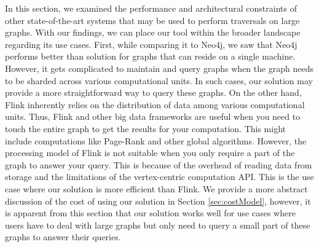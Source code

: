 \bigskip
In this section, we examined the performance and architectural constraints of
other state-of-the-art systems that may be used to perform traversals on
large graphs. With our findings, we can place our tool within the broader
landscape regarding its use cases. First, while comparing it to Neo4j, we saw that
Neo4j performs better than solution for graphs
that can reside on a single machine. However, it gets complicated to maintain
and query graphs when the graph needs to be sharded across various computational
units. In such cases, our solution may provide a more straightforward way to query these
graphs. On the other hand, Flink inherently relies on the distribution of data among
various computational units. Thus, Flink and other big data frameworks are
useful when you need to touch the entire graph to get the results for
your computation. This might include computations like Page-Rank and other
global algorithms. However, the processing model of Flink is not suitable when
you only require a part of the graph to answer your query. This is because of the overhead
of reading data from storage and the limitations of the vertex-centric computation API. This is 
the use case where our solution is more efficient than Flink. We provide
a more abstract discussion of the cost of using our solution in Section
\ref{sec:costModel}, however, it is apparent from this section that our
solution works well for use cases where users have to deal with large graphs but
only need to query a small part of these graphs to answer their queries.
